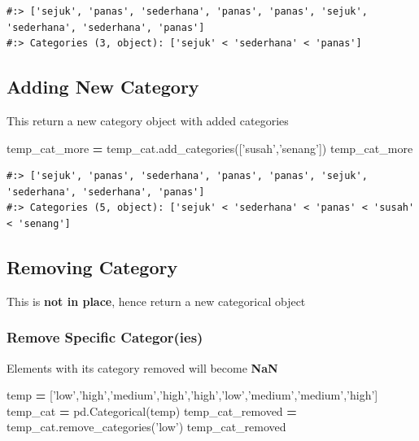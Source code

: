 \documentclass[
]{book}
\newenvironment{Shaded}{\begin{snugshade}}{\end{snugshade}}
\newcommand{\NormalTok}[1]{#1}
\newcommand{\OperatorTok}[1]{\textcolor[rgb]{0.43,0.43,0.43}{\textbf{#1}}}
\newcommand{\StringTok}[1]{\textcolor[rgb]{0.5,0.5,0.5}{#1}}
\begin{document}
\begin{verbatim}
#:> ['sejuk', 'panas', 'sederhana', 'panas', 'panas', 'sejuk', 'sederhana', 'sederhana', 'panas']
#:> Categories (3, object): ['sejuk' < 'sederhana' < 'panas']
\end{verbatim}

\hypertarget{adding-new-category}{%
\subsection{Adding New Category}\label{adding-new-category}}

This return a new category object with added categories

\begin{Shaded}
\begin{Highlighting}[]
\NormalTok{temp_cat_more }\OperatorTok{=}\NormalTok{ temp_cat.add_categories([}\StringTok{'susah'}\NormalTok{,}\StringTok{'senang'}\NormalTok{])}
\NormalTok{temp_cat_more}
\end{Highlighting}
\end{Shaded}

\begin{verbatim}
#:> ['sejuk', 'panas', 'sederhana', 'panas', 'panas', 'sejuk', 'sederhana', 'sederhana', 'panas']
#:> Categories (5, object): ['sejuk' < 'sederhana' < 'panas' < 'susah' < 'senang']
\end{verbatim}

\hypertarget{removing-category}{%
\subsection{Removing Category}\label{removing-category}}

This is \textbf{not in place}, hence return a new categorical object

\hypertarget{remove-specific-categories}{%
\subsubsection{Remove Specific Categor(ies)}\label{remove-specific-categories}}

Elements with its category removed will become \textbf{NaN}

\begin{Shaded}
\begin{Highlighting}[]
\NormalTok{temp }\OperatorTok{=}\NormalTok{ [}\StringTok{'low'}\NormalTok{,}\StringTok{'high'}\NormalTok{,}\StringTok{'medium'}\NormalTok{,}\StringTok{'high'}\NormalTok{,}\StringTok{'high'}\NormalTok{,}\StringTok{'low'}\NormalTok{,}\StringTok{'medium'}\NormalTok{,}\StringTok{'medium'}\NormalTok{,}\StringTok{'high'}\NormalTok{]}
\NormalTok{temp_cat }\OperatorTok{=}\NormalTok{ pd.Categorical(temp)}
\NormalTok{temp_cat_removed }\OperatorTok{=}\NormalTok{ temp_cat.remove_categories(}\StringTok{'low'}\NormalTok{)}
\NormalTok{temp_cat_removed}
\end{Highlighting}
\end{Shaded}
\end{document}
